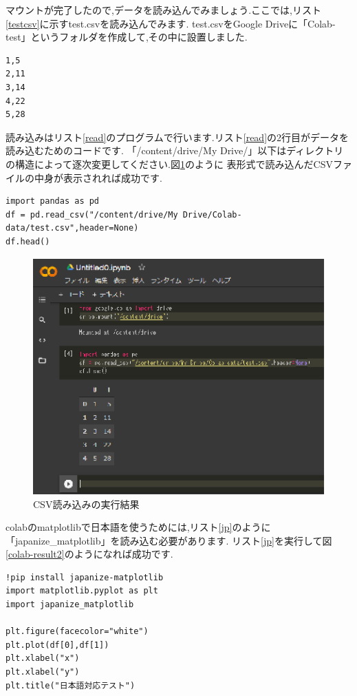 \documentclass[a4j]{jarticle}
\begin{document}
      マウントが完了したので,データを読み込んでみましょう.ここでは,リスト\ref{testcsv}に示すtest.csvを読み込んでみます.
      test.csvをGoogle Driveに「Colab-test」というフォルダを作成して,その中に設置しました.
      \begin{lstlisting}[basicstyle=\ttfamily\footnotesize, frame=single,label=testcsv,caption=test.csv]
1,5
2,11
3,14
4,22
5,28
      \end{lstlisting}

      読み込みはリスト\ref{read}のプログラムで行います.リスト\ref{read}の2行目がデータを読み込むためのコードです.
      「/content/drive/My Drive/」以下はディレクトリの構造によって逐次変更してください.図\ref{colab-result1}のように
      表形式で読み込んだCSVファイルの中身が表示されれば成功です.
      \begin{lstlisting}[basicstyle=\ttfamily\footnotesize, frame=single,label=read,caption=データの読み込み]
import pandas as pd
df = pd.read_csv("/content/drive/My Drive/Colab-data/test.csv",header=None)
df.head()
      \end{lstlisting}

      \begin{figure}[H]
        \centering
        \includegraphics[scale=2.0]{colab-result1.eps}
        \caption{CSV読み込みの実行結果}
         \label{colab-result1}
        \end{figure}

        colabのmatplotlibで日本語を使うためには,リスト\ref{jp}のように「japanize\_matplotlib」を読み込む必要があります.
        リスト\ref{jp}を実行して図\ref{colab-result2}のようになれば成功です.
        \begin{lstlisting}[basicstyle=\ttfamily\footnotesize, frame=single,label=jp,caption=日本語対応のコード]
!pip install japanize-matplotlib
import matplotlib.pyplot as plt
import japanize_matplotlib 

plt.figure(facecolor="white")
plt.plot(df[0],df[1])
plt.xlabel("x")
plt.xlabel("y")
plt.title("日本語対応テスト")          
        \end{lstlisting}
\end{document}

